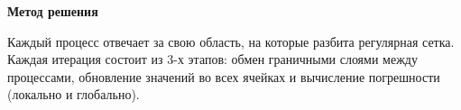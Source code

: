 \textbf{\large Метод решения}

Каждый процесс отвечает за свою область, на которые разбита регулярная сетка. Каждая итерация состоит из 3-х этапов: обмен граничными слоями между процессами, обновление значений во всех ячейках и вычисление погрешности (локально и глобально).

